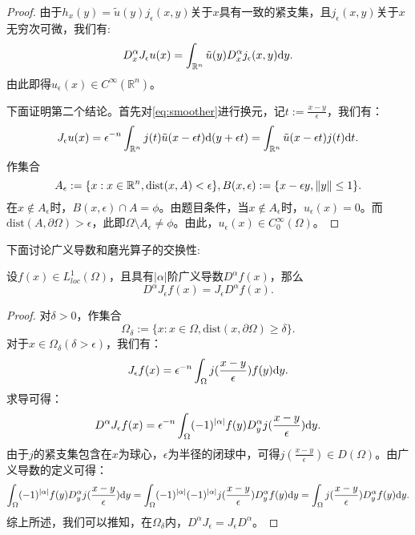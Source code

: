 \begin{proof}
    由于$h_{x}(y)=\tilde{u}(y)j_{\epsilon}(x,y)$关于$x$具有一致的紧支集，且$j_{\epsilon}(x,y)$关于$x$无穷次可微，我们有:
    \begin{equation}
        D_{x}^{\alpha}J_{\epsilon}u(x)=\int_{\mathbb{R}^{n}}\tilde{u}(y)D_{x}^{\alpha}j_{\epsilon}(x,y)\mathrm{d} y.
    \end{equation}
    由此即得$u_{\epsilon}(x)\in C^{\infty}(\mathbb{R}^{n})$。
    
    下面证明第二个结论。首先对\eqref{eq:smoother}进行换元，记$t:=\frac{x-y}{\epsilon}$，我们有：
    \begin{equation}
        \label{eq:smoother2}
        J_{\epsilon}u(x)=\epsilon^{-n}\int_{\mathbb{R}^{n}}j(t)\tilde{u}(x-\epsilon t)\mathrm{d} (y+\epsilon t)=\int_{\mathbb{R}^{n}}\tilde{u}(x-\epsilon t)j(t)\mathrm{d} t.
    \end{equation}
    作集合
    \begin{equation}
        A_{\epsilon}:=\{x:x\in\mathbb{R}^{n},\text{dist}(x,A)<\epsilon\},
        B(x,\epsilon):=\{x-\epsilon y,\|y\|\le 1\}.
    \end{equation}
    在$x\notin A_{\epsilon}$时，$B(x,\epsilon)\cap A=\phi$。由题目条件，当$x\notin A_{\epsilon}$时，$u_{\epsilon}(x)=0$。而$\text{dist}(A,\partial\Omega)>\epsilon$，此即$\Omega\setminus A_{\epsilon}\neq\phi$。由此，$u_{\epsilon}(x)\in C_{0}^{\infty}(\Omega)$。
\end{proof}
    下面讨论广义导数和磨光算子的交换性:
    \begin{theorem}
        设$f(x)\in L_{loc}^{1}(\Omega)$，且具有$|\alpha|$阶广义导数$D^{\alpha}f(x)$，那么
        \begin{equation}
            D^{\alpha}J_{\epsilon}f(x)=J_{\epsilon}D^{\alpha}f(x).
        \end{equation}
    \end{theorem}
\begin{proof}
    对$\delta>0$，作集合
    \begin{equation}
        \Omega_{\delta}:=\{x:x\in\Omega,\text{dist}(x,\partial\Omega)\ge\delta\}.
    \end{equation}
    对于$x\in\Omega_{\delta}(\delta>\epsilon)$，我们有：
    \begin{equation}
        J_{\epsilon}f(x)=\epsilon^{-n}\int_{\Omega}j(\frac{x-y}{\epsilon})f(y)\mathrm{d} y.
    \end{equation}
    求导可得：
    \begin{equation}
        D^{\alpha}J_{\epsilon}f(x)=\epsilon^{-n}\int_{\Omega}(-1)^{|\alpha|}f(y)D_{y}^{\alpha}j(\frac{x-y}{\epsilon})\mathrm{d} y.
    \end{equation}
    由于$j$的紧支集包含在$x$为球心，$\epsilon$为半径的闭球中，可得$j(\frac{x-y}{\epsilon})\in D(\Omega)$。由广义导数的定义可得：
    \begin{equation}
        \int_{\Omega}(-1)^{|\alpha|}f(y)D_{y}^{\alpha}j(\frac{x-y}{\epsilon})\mathrm{d} y=\int_{\Omega}(-1)^{|\alpha|}(-1)^{|\alpha|}j(\frac{x-y}{\epsilon})D_{y}^{\alpha}f(y)\mathrm{d} y=\int_{\Omega}j(\frac{x-y}{\epsilon})D_{y}^{\alpha}f(y)\mathrm{d} y.
    \end{equation}
    综上所述，我们可以推知，在$\Omega_{\delta}$内，$D^{\alpha}J_{\epsilon}=J_{\epsilon}D^{\alpha}$。
\end{proof}
